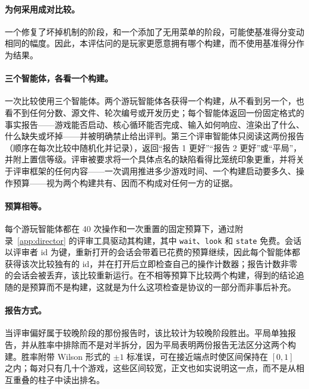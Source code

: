 \paragraph{为何采用成对比较。}一个修复了坏掉机制的阶段，和一个添加了无用菜单的阶段，可能使基准得分变动相同的幅度。因此，本评估问的是玩家更愿意拥有哪个构建，而不使用基准得分作为结果。

\paragraph{三个智能体，各看一个构建。}一次比较使用三个智能体。两个游玩智能体各获得一个构建，从不看到另一个，也看不到任何分数、源文件、轮次编号或开发历史；每个智能体返回一份固定格式的事实报告——游戏能否启动、核心循环能否完成、输入如何响应、渲染出了什么、什么缺失或坏掉——并被明确禁止给出评判。第三个评审智能体只阅读这两份报告（顺序在每次比较中随机化并记录），返回“报告 1 更好”“报告 2 更好”或“平局”，并附上置信等级。评审被要求将一个具体点名的缺陷看得比笼统印象更重，并将关于评审框架的任何内容——一次调用推进多少游戏时间、一个构建启动要多久、操作预算——视为两个构建共有、因而不构成对任何一方的证据。

\paragraph{预算相等。}每个游玩智能体都在 40 次操作和一次重置的固定预算下，通过附录~\ref{app:director} 的评审工具驱动其构建，其中 \texttt{wait}、\texttt{look} 和 \texttt{state} 免费。会话以评审者 id 为键，重新打开的会话会带着已花费的预算继续，因此每个智能体都获得该次比较独有的 id，并在打开后立即检查自己的操作计数器；报告计数非零的会话会被丢弃，该比较重新运行。在不相等预算下比较两个构建，得到的结论追随的是预算而不是构建，这就是为什么这项检查是协议的一部分而非事后补充。

\paragraph{报告方式。}当评审偏好属于较晚阶段的那份报告时，该比较计为较晚阶段胜出。平局单独报告，并从胜率中排除而不是对半拆分，因为平局表明两份报告无法区分这两个构建。胜率附带 Wilson 形式的 $\pm1$ 标准误，可在接近端点时使区间保持在 $[0,1]$ 之内；每对只有几十个游戏，这些区间较宽，正文也如实说明这一点，而不是从相互重叠的柱子中读出排名。
